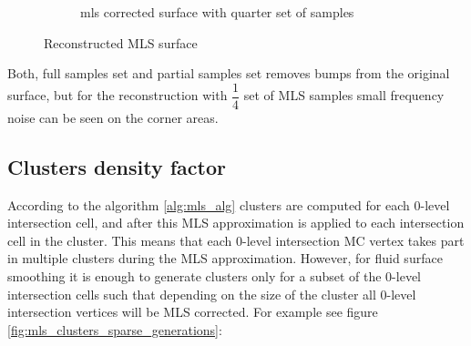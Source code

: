 \begin{figure}
\begin{center}
\begin{subfigure}[b]{\textwidth}
			\caption{mls corrected surface with quarter set of samples}
		\end{subfigure}
	\end{center}
	\caption{Reconstructed MLS surface} \label{fig:surface_sampling_results}
\end{figure}
Both, full samples set and partial samples set removes bumps from the original surface, but for the reconstruction with $\dfrac{1}{4}$ set of MLS samples small frequency noise can be seen on the corner areas.\\

\subsection{Clusters density factor}
According to the algorithm \ref{alg:mls_alg} clusters are computed for each 0-level intersection cell, and after this MLS approximation is applied to each intersection cell in the cluster. This means that each 0-level intersection MC vertex takes part in multiple clusters during the MLS approximation. However, for fluid surface smoothing it is enough to generate clusters only for a subset of the 0-level intersection cells such that depending on the size of the cluster all 0-level intersection vertices will be MLS corrected. For example see figure \ref{fig:mls_clusters_sparse_generations}:
